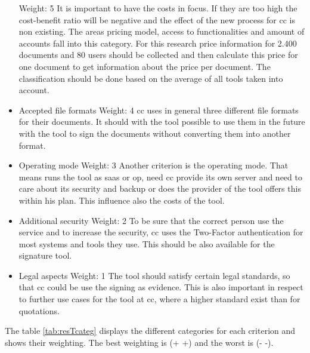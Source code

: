 \begin{itemize}
	Weight: 5 \newline
	It is important to have the costs in focus. If they are too high the cost-benefit ratio will be negative and the effect of the new process for \gls{cc} is non existing. The areas pricing model, access to functionalities and amount of accounts fall into this category. For this research price information for 2.400 documents and 80 users should be collected and then calculate this price for one document to get information about the price per document. The classification should be done based on the average of all tools taken into account.
	\item Accepted file formats \newline
	Weight: 4 \newline
	\Gls{cc} uses in general three different file formats for their documents. It should with the tool possible to use them in the future with the tool to sign the documents without converting them into another format.
	\item Operating mode \newline
	Weight: 3 \newline
	Another criterion is the operating mode. That means runs the tool as \gls{saas} or \gls{op}, need \gls{cc} provide its own server and need to care about its security and backup or does the provider of the tool offers this within his plan. This influence also the costs of the tool.
	\item Additional security \newline
	Weight: 2 \newline
	To be sure that the correct person use the service and to increase the security, \gls{cc} uses the Two-Factor authentication for most systems and tools they use. This should be also available for the signature tool.
	\item Legal aspects \newline
	Weight: 1 \newline
	The tool should satisfy certain legal standards, so that \gls{cc} could be use the signing as evidence. This is also important in respect to further use cases for the tool at \gls{cc}, where a higher standard exist than for quotations.
\end{itemize}

The table \ref{tab:resTcateg} displays the different categories for each criterion and shows
their weighting. The best weighting is (+ +) and the worst is (- -). 

